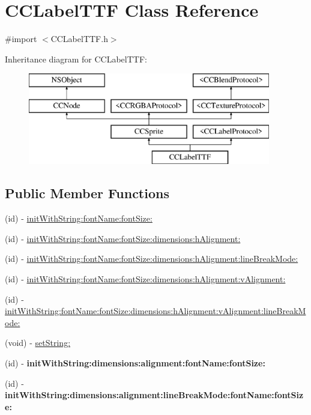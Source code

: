 \hypertarget{class_c_c_label_t_t_f}{\section{C\-C\-Label\-T\-T\-F Class Reference}
\label{class_c_c_label_t_t_f}
}


{\ttfamily \#import $<$C\-C\-Label\-T\-T\-F.\-h$>$}

Inheritance diagram for C\-C\-Label\-T\-T\-F\-:\begin{figure}[H]
\begin{center}
\leavevmode
\includegraphics[height=4.000000cm]{class_c_c_label_t_t_f}
\end{center}
\end{figure}
\subsection*{Public Member Functions}
\begin{DoxyCompactItemize}
\item 
(id) -\/ \hyperlink{class_c_c_label_t_t_f_a9a4f174ff32513d6e59587fff4c2bf45}{init\-With\-String\-:font\-Name\-:font\-Size\-:}
\item 
(id) -\/ \hyperlink{class_c_c_label_t_t_f_a2721ef80b78cd244f63750a025439b70}{init\-With\-String\-:font\-Name\-:font\-Size\-:dimensions\-:h\-Alignment\-:}
\item 
(id) -\/ \hyperlink{class_c_c_label_t_t_f_af6c3d6aeed023a10e26899d1b4b988fe}{init\-With\-String\-:font\-Name\-:font\-Size\-:dimensions\-:h\-Alignment\-:line\-Break\-Mode\-:}
\item 
(id) -\/ \hyperlink{class_c_c_label_t_t_f_abea7f454489d9ca76915d044416e2cc5}{init\-With\-String\-:font\-Name\-:font\-Size\-:dimensions\-:h\-Alignment\-:v\-Alignment\-:}
\item 
(id) -\/ \hyperlink{class_c_c_label_t_t_f_a865e196ffd2ae81f2cad64fe840a79b6}{init\-With\-String\-:font\-Name\-:font\-Size\-:dimensions\-:h\-Alignment\-:v\-Alignment\-:line\-Break\-Mode\-:}
\item 
(void) -\/ \hyperlink{class_c_c_label_t_t_f_a0866cc109f50d7ad40b06288f12413b7}{set\-String\-:}
\item 
\hypertarget{class_c_c_label_t_t_f_a0d3585aa957654ad88f4e3bca3c83154}{(id) -\/ {\bfseries init\-With\-String\-:dimensions\-:alignment\-:font\-Name\-:font\-Size\-:}}\label{class_c_c_label_t_t_f_a0d3585aa957654ad88f4e3bca3c83154}

\item 
\hypertarget{class_c_c_label_t_t_f_a562e0d00295a1dd2e4cfe368150a0f85}{(id) -\/ {\bfseries init\-With\-String\-:dimensions\-:alignment\-:line\-Break\-Mode\-:font\-Name\-:font\-Size\-:}}\label{class_c_c_label_t_t_f_a562e0d00295a1dd2e4cfe368150a0f85}

\end{DoxyCompactItemize}
